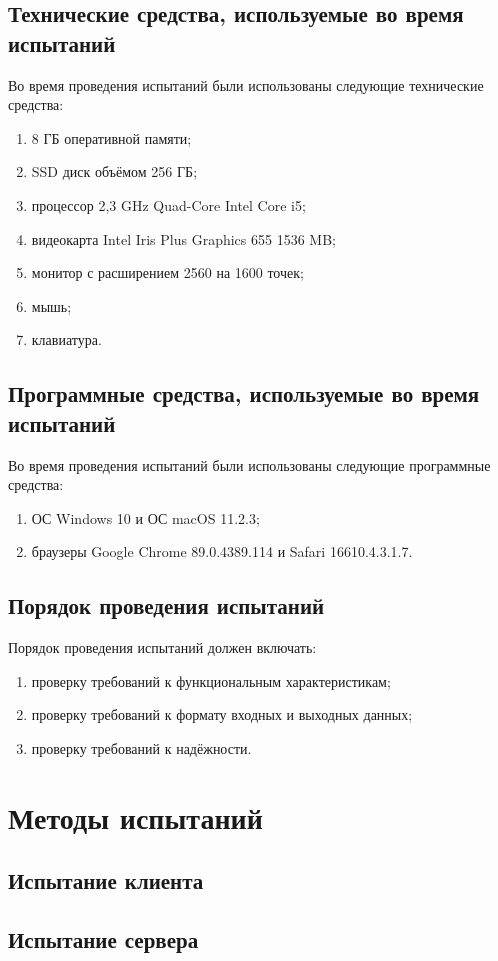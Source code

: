 \documentclass{../includes/TechDocMultiAuthors}
\begin{document}
    \subsection{Технические средства, используемые во время испытаний}

    Во время проведения испытаний были использованы следующие технические средства:

    \begin{enumerate}
        \item 8 ГБ оперативной памяти;
        \item SSD диск объёмом 256 ГБ;
        \item процессор 2,3 GHz Quad-Core Intel Core i5;
        \item видеокарта Intel Iris Plus Graphics 655 1536 MB;
        \item монитор с расширением 2560 на 1600 точек;
        \item мышь;
        \item клавиатура.
    \end{enumerate}

    \subsection{Программные средства, используемые во время испытаний}

    Во время проведения испытаний были использованы следующие программные средства:
    
    \begin{enumerate}
        \item ОС Windows 10 и ОС macOS 11.2.3;
        \item браузеры Google Chrome 89.0.4389.114 и Safari 16610.4.3.1.7.
    \end{enumerate}

    \subsection{Порядок проведения испытаний}

    Порядок проведения испытаний должен включать:

    \begin{enumerate}
        \item проверку требований к функциональным характеристикам;
        \item проверку требований к формату входных и выходных данных;
        \item проверку требований к надёжности.
    \end{enumerate}

    \section{Методы испытаний}

    \subsection{Испытание клиента}

    \subsection{Испытание сервера}

    \registrationList
\end{document}
